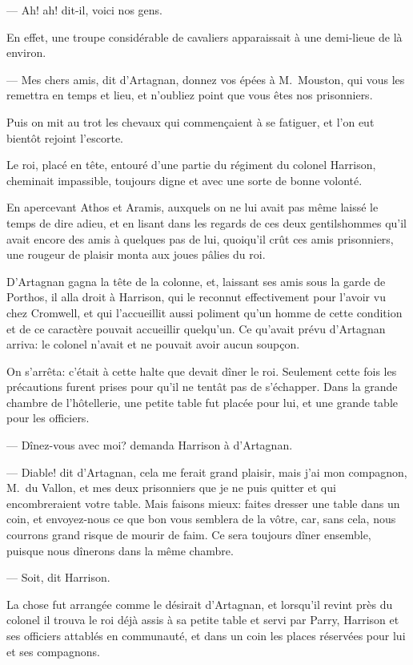 — Ah! ah! dit-il, voici nos gens.

En effet, une troupe considérable de cavaliers apparaissait à une demi-lieue de là environ.

— Mes chers amis, dit d'Artagnan, donnez vos épées à M.~Mouston, qui vous les remettra en temps et lieu, et n'oubliez point que vous êtes nos prisonniers.

Puis on mit au trot les chevaux qui commençaient à se fatiguer, et l'on eut bientôt rejoint l'escorte.

Le roi, placé en tête, entouré d'une partie du régiment du colonel Harrison, cheminait impassible, toujours digne et avec une sorte de bonne volonté.

En apercevant Athos et Aramis, auxquels on ne lui avait pas même laissé le temps de dire adieu, et en lisant dans les regards de ces deux gentilshommes qu'il avait encore des amis à quelques pas de lui, quoiqu'il crût ces amis prisonniers, une rougeur de plaisir monta aux joues pâlies du roi.

D'Artagnan gagna la tête de la colonne, et, laissant ses amis sous la garde de Porthos, il alla droit à Harrison, qui le reconnut effectivement pour l'avoir vu chez Cromwell, et qui l'accueillit aussi poliment qu'un homme de cette condition et de ce caractère pouvait accueillir quelqu'un. Ce qu'avait prévu d'Artagnan arriva: le colonel n'avait et ne pouvait avoir aucun soupçon.

On s'arrêta: c'était à cette halte que devait dîner le roi. Seulement cette fois les précautions furent prises pour qu'il ne tentât pas de s'échapper. Dans la grande chambre de l'hôtellerie, une petite table fut placée pour lui, et une grande table pour les officiers.

— Dînez-vous avec moi? demanda Harrison à d'Artagnan.

— Diable! dit d'Artagnan, cela me ferait grand plaisir, mais j'ai mon compagnon, M.~du Vallon, et mes deux prisonniers que je ne puis quitter et qui encombreraient votre table. Mais faisons mieux: faites dresser une table dans un coin, et envoyez-nous ce que bon vous semblera de la vôtre, car, sans cela, nous courrons grand risque de mourir de faim. Ce sera toujours dîner ensemble, puisque nous dînerons dans la même chambre.

— Soit, dit Harrison.

La chose fut arrangée comme le désirait d'Artagnan, et lorsqu'il revint près du colonel il trouva le roi déjà assis à sa petite table et servi par Parry, Harrison et ses officiers attablés en communauté, et dans un coin les places réservées pour lui et ses compagnons.

